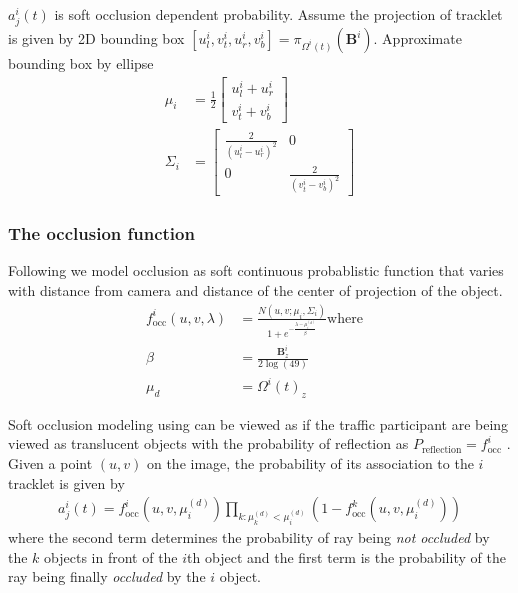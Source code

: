 \documentclass{beamer} %
\newcommand{\relp}[2]{\Omega^{#1}(#2)}
\newcommand{\projectionOfi}[2]{\pi_{\relp{#1}{t}}(#2)}
\newcommand{\projectionOf}[1]{\projectionOfi{i}{#1}}
\newcommand{\dimsn}[1]{\mathbf{B}^{#1}}
\begin{document}
\begin{frame}
  $a_j^i(t)$ is soft occlusion dependent probability. Assume the projection of
  tracklet is given by 2D bounding box $[u^i_l, v^i_t, u^i_r, v^i_b] =
\projectionOf{\dimsn{i}}$. Approximate bounding box by ellipse
\begin{align}
\mu_i &= \frac{1}{2}\begin{bmatrix}u^i_l + u^i_r\\v^i_t + v^i_b
\end{bmatrix}\\
\Sigma_i &= \begin{bmatrix} 
\frac{2}{(u^i_l - u^i_r)^2} & 0 \\
0 & \frac{2}{(v^i_t - v^i_b)^2} 
\end{bmatrix}
\end{align}

\end{frame}
\begin{frame}
  \frametitle{The occlusion function}
  Following \cite{milan2013continuous} we model occlusion as soft continuous
  probablistic function that varies with distance from camera and distance of
  the center of projection of the object.
  \begin{align}
    f^i_{\text{occ}}(u, v, \lambda) &= \frac{N(u,v; \mu_i, \Sigma_i)}
    {1 + e^{-\frac{\lambda - \mu^{(d)}_i}{\beta}}}
    \text{where} &\\
    \beta &= \frac{\dimsn{i}_z}{2\log(49)}\\
    \mu_d &= \relp{i}{t}_z
  \end{align}
\end{frame}

\begin{frame}
  Soft occlusion modeling using can be viewed as if the traffic
  participant are being viewed as translucent objects with the probability of
  reflection as $P_{\text{reflection}} = f^i_{\text{occ}}$ . Given a point
  $(u,v)$ on the image, the probability of its association to the $i$ tracklet
  is given by
  \begin{align}
    a^i_j(t) = f^i_{\text{occ}}(u, v, \mu^{(d)}_i)\prod_{k : {\mu^{(d)}_k < \mu^{(d)}_i}}(1 -
    f^k_{\text{occ}}(u, v, \mu^{(d)}_i))
  \end{align}
  where the second term determines the probability of ray being \emph{not
  occluded} by the $k$ objects in front of the $i$th object and the first term
  is the probability of the ray being finally \emph{occluded} by the $i$
  object.
\end{frame}
\end{document}
